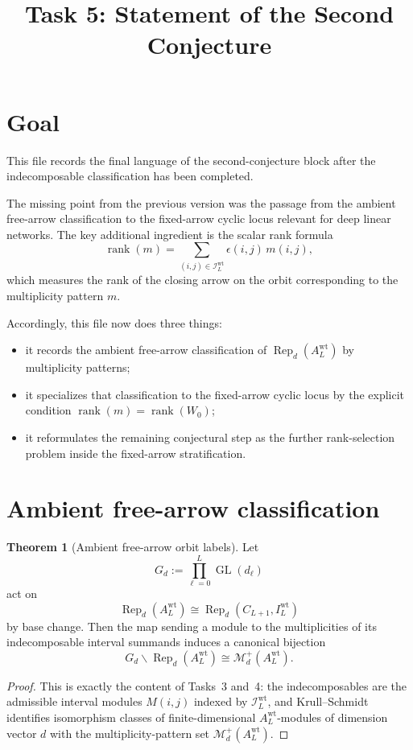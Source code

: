 \documentclass{article}
\title{Task 5: Statement of the Second Conjecture}
\date{}
\newcommand{\rk}{\operatorname{rank}}
\newcommand{\GL}{\operatorname{GL}}
\newcommand{\Rep}{\operatorname{Rep}}
\theoremstyle{definition}
\newtheorem{theorem}{Theorem}[section]
\begin{document}
\maketitle

\section{Goal}

This file records the final language of the second-conjecture block after the
indecomposable classification has been completed.

The missing point from the previous version was the passage from the ambient
free-arrow classification to the fixed-arrow cyclic locus relevant for deep
linear networks. The key additional ingredient is the scalar rank formula
\[
\rk(m)=\sum_{(i,j)\in \mathcal I_L^{\mathrm{wt}}}\epsilon(i,j)\,m(i,j),
\]
which measures the rank of the closing arrow on the orbit corresponding to the
multiplicity pattern $m$.

Accordingly, this file now does three things:

\begin{itemize}
\item it records the ambient free-arrow classification of
  $\Rep_d(A_L^{\mathrm{wt}})$ by multiplicity patterns;
\item it specializes that classification to the fixed-arrow cyclic locus by the
  explicit condition $\rk(m)=\rk(W_0)$;
\item it reformulates the remaining conjectural step as the further
  rank-selection problem inside the fixed-arrow stratification.
\end{itemize}

\section{Ambient free-arrow classification}

\begin{theorem}[Ambient free-arrow orbit labels]
Let
\[
G_d:=\prod_{\ell=0}^L \GL(d_\ell)
\]
act on
\[
\Rep_d(A_L^{\mathrm{wt}})
\cong
\Rep_d(C_{L+1},I_L^{\mathrm{wt}})
\]
by base change. Then the map sending a module to the multiplicities of its
indecomposable interval summands induces a canonical bijection
\[
G_d\backslash \Rep_d(A_L^{\mathrm{wt}})
\cong
\mathcal M_d^+(A_L^{\mathrm{wt}}).
\]
\end{theorem}

\begin{proof}
This is exactly the content of Tasks~3 and~4: the indecomposables are the
admissible interval modules $M(i,j)$ indexed by
$\mathcal I_L^{\mathrm{wt}}$, and Krull--Schmidt identifies isomorphism classes
of finite-dimensional $A_L^{\mathrm{wt}}$-modules of dimension vector $d$ with
the multiplicity-pattern set $\mathcal M_d^+(A_L^{\mathrm{wt}})$.
\end{proof}
\end{document}
